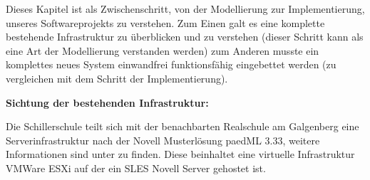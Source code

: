 \documentclass[12pt, twoside, a4paper, ngerman]{article}
\begin{document}
Dieses Kapitel ist als Zwischenschritt, von der Modellierung zur Implementierung, unseres Softwareprojekts zu verstehen.
Zum Einen galt es eine komplette bestehende Infrastruktur zu überblicken und zu verstehen (dieser Schritt kann als eine Art der Modellierung verstanden werden)
zum Anderen musste ein komplettes neues System einwandfrei funktionsfähig eingebettet werden (zu vergleichen mit dem Schritt der Implementierung).

\textbf{Sichtung der bestehenden Infrastruktur:}

Die Schillerschule teilt sich mit der benachbarten Realschule am Galgenberg eine Serverinfrastruktur nach der Novell Musterlösung paedML 3.33, weitere Informationen sind unter \cite{paedML} zu finden. %
Diese beinhaltet eine virtuelle Infrastruktur \gls{VMWare} ESXi auf der ein \ac{SLES} Novell Server gehostet ist.
\end{document}
